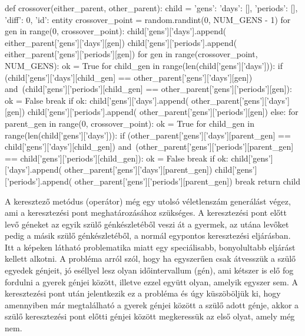 \documentclass[12pt,a4paper]{report}
\begin{document}
\begin{python}
def crossover(either_parent, other_parent):
    child = {'gens': {'days': [], 'periods': []},
             'diff': 0, 'id': entity}
    crossover_point = random.randint(0, NUM_GENS - 1)
    for gen in range(0, crossover_point):
        child['gens']['days'].append(
            either_parent['gens']['days'][gen])
        child['gens']['periods'].append(
            either_parent['gens']['periods'][gen])
    for gen in range(crossover_point, NUM_GENS):
        ok = True
        for child_gen in range(len(child['gens']['days'])):
            if (child['gens']['days'][child_gen] ==
               other_parent['gens']['days'][gen]) and\
               (child['gens']['periods'][child_gen] ==
               other_parent['gens']['periods'][gen]):
                ok = False
                break
        if ok:
            child['gens']['days'].append(
                other_parent['gens']['days'][gen])
            child['gens']['periods'].append(
                other_parent['gens']['periods'][gen])
        else:
            for parent_gen in range(0, crossover_point):
                ok = True
                for child_gen in range(len(child['gens']['days'])):
                    if (other_parent['gens']['days'][parent_gen] ==
                       child['gens']['days'][child_gen]) and\
                       (other_parent['gens']['periods'][parent_gen] ==
                       child['gens']['periods'][child_gen]):
                        ok = False
                        break
                if ok:
                    child['gens']['days'].append(
                        other_parent['gens']['days'][parent_gen])
                    child['gens']['periods'].append(
                        other_parent['gens']['periods'][parent_gen])
                    break
    return child
\end{python}

A keresztező metódus (operátor) még egy utolsó véletlenszám generálást végez, ami a keresztezési pont meghatározásához szükséges. A keresztezési pont előtt levő géneket az egyik szülő génkészletéből veszi át a gyermek, az utána levőket pedig a másik szülő génkészletéből, a normál egypontos keresztezési eljárásban. Itt a képeken látható problematika miatt egy speciálisabb, bonyolultabb eljárást kellett alkotni. A probléma arról szól, hogy ha egyszerűen csak átvesszük a szülő egyedek génjeit, jó eséllyel lesz olyan időintervallum (gén), ami kétszer is elő fog fordulni a gyerek génjei között, illetve ezzel együtt olyan, amelyik egyszer sem. A keresztezési pont után jelentkezik ez a probléma és úgy küszöböljük ki, hogy amennyiben már megtalálható a gyerek génjei között a szülő adott génje, akkor a szülő keresztezési pont előtti génjei között megkeressük az első olyat, amely még nem.
\end{document}
